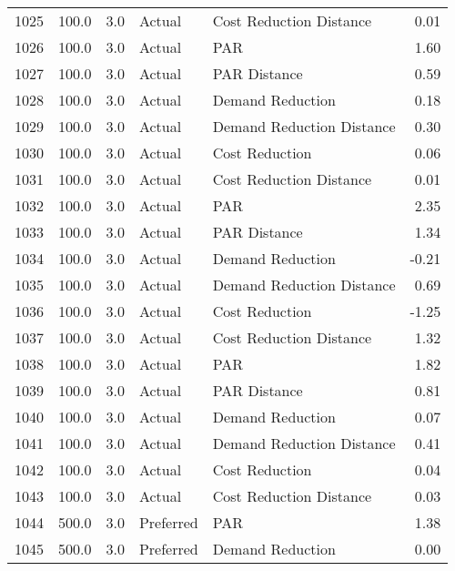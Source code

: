 \begin{longtable}{lrrllr}
1025 &        100.0 &     3.0 &         Actual &    Cost Reduction Distance &   0.01 \\
1026 &        100.0 &     3.0 &         Actual &                        PAR &   1.60 \\
1027 &        100.0 &     3.0 &         Actual &               PAR Distance &   0.59 \\
1028 &        100.0 &     3.0 &         Actual &           Demand Reduction &   0.18 \\
1029 &        100.0 &     3.0 &         Actual &  Demand Reduction Distance &   0.30 \\
1030 &        100.0 &     3.0 &         Actual &             Cost Reduction &   0.06 \\
1031 &        100.0 &     3.0 &         Actual &    Cost Reduction Distance &   0.01 \\
1032 &        100.0 &     3.0 &         Actual &                        PAR &   2.35 \\
1033 &        100.0 &     3.0 &         Actual &               PAR Distance &   1.34 \\
1034 &        100.0 &     3.0 &         Actual &           Demand Reduction &  -0.21 \\
1035 &        100.0 &     3.0 &         Actual &  Demand Reduction Distance &   0.69 \\
1036 &        100.0 &     3.0 &         Actual &             Cost Reduction &  -1.25 \\
1037 &        100.0 &     3.0 &         Actual &    Cost Reduction Distance &   1.32 \\
1038 &        100.0 &     3.0 &         Actual &                        PAR &   1.82 \\
1039 &        100.0 &     3.0 &         Actual &               PAR Distance &   0.81 \\
1040 &        100.0 &     3.0 &         Actual &           Demand Reduction &   0.07 \\
1041 &        100.0 &     3.0 &         Actual &  Demand Reduction Distance &   0.41 \\
1042 &        100.0 &     3.0 &         Actual &             Cost Reduction &   0.04 \\
1043 &        100.0 &     3.0 &         Actual &    Cost Reduction Distance &   0.03 \\
1044 &        500.0 &     3.0 &      Preferred &                        PAR &   1.38 \\
1045 &        500.0 &     3.0 &      Preferred &           Demand Reduction &   0.00 \\

\end{longtable}
